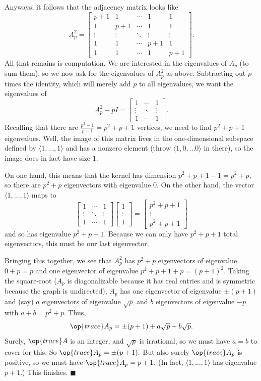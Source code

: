 Anyways, it follows that the adjacency matrix looks like
\[A_p^2=\begin{bmatrix}
    p+1 & 1 & \cdots & 1 & 1 \\
    1 & p+1 & \cdots & 1 & 1 \\
    \vdots & \vdots & \ddots & \vdots & \vdots \\
    1 & 1 & \cdots & p+1 & 1 \\
    1 & 1 & \cdots & 1 & p+1
\end{bmatrix}.\]
All that remains is computation. We are interested in the eigenvalues of $A_p$ (to sum them), so we now ask for the eigenvalues of $A_p^2$ as above. Subtracting out $p$ times the identity, which will merely add $p$ to all eigenvalues, we want the eigenvalues of
\[A_p^2-pI=\begin{bmatrix}
    1 & \cdots & 1 \\
    \vdots & \ddots & \vdots \\
    1 & \cdots & 1
\end{bmatrix}.\]
Recalling that there are $\frac{p^3-1}{p-1}=p^2+p+1$ vertices, we need to find $p^2+p+1$ eigenvalues. Well, the image of this matrix lives in the one-dimensional subspace defined by $\langle1,\ldots,1\rangle$ and has a nonzero element (throw $\langle1,0,\ldots0\rangle$ in there), so the image does in fact have size $1.$

On one hand, this means that the kernel has dimension $p^2+p+1-1=p^2+p,$ so there are $p^2+p$ eigenvectors with eigenvalue $0.$ On the other hand, the vector $\langle1,\ldots,1\rangle$ maps to
\[\begin{bmatrix}
    1 & \cdots & 1 \\
    \vdots & \ddots & \vdots \\
    1 & \cdots & 1
\end{bmatrix}\begin{bmatrix}1 \\ \vdots \\ 1\end{bmatrix}=\begin{bmatrix}p^2+p+1 \\ \vdots \\ p^2+p+1\end{bmatrix}\]
and so has eigenvalue $p^2+p+1.$ Because we can only have $p^2+p+1$ total eigenvectors, this must be our last eigenvector.

Bringing this together, we see that $A_p^2$ has $p^2+p$ eigenvectors of eigenvalue $0+p=p$ and one eigenvector of eigenvalue $p^2+p+1+p=(p+1)^2.$ Taking the square-root ($A_p$ is diagonalizable because it has real entries and is symmetric because the graph is undirected), $A_p$ has one eigenvector of eigenvalue $\pm(p+1)$ and (say) $a$ eigenvectors of eigenvalue $\sqrt p$ and $b$ eigenvectors of eigenvalue $-p$ with $a+b=p^2+p.$ Thus,
\[\op{trace}A_p=\pm(p+1)+a\sqrt p-b\sqrt p.\]
Surely, $\op{trace}A$ is an integer, and $\sqrt p$ is irrational, so we must have $a=b$ to cover for this. So $\op{trace}A_p=\pm(p+1).$ But also surely $\op{trace}A_p$ is positive, so we must have $\op{trace}A_p=p+1.$ (In fact, $\langle1,\ldots,1\rangle$ has eigenvalue $p+1.$) This finishes. $\blacksquare$

